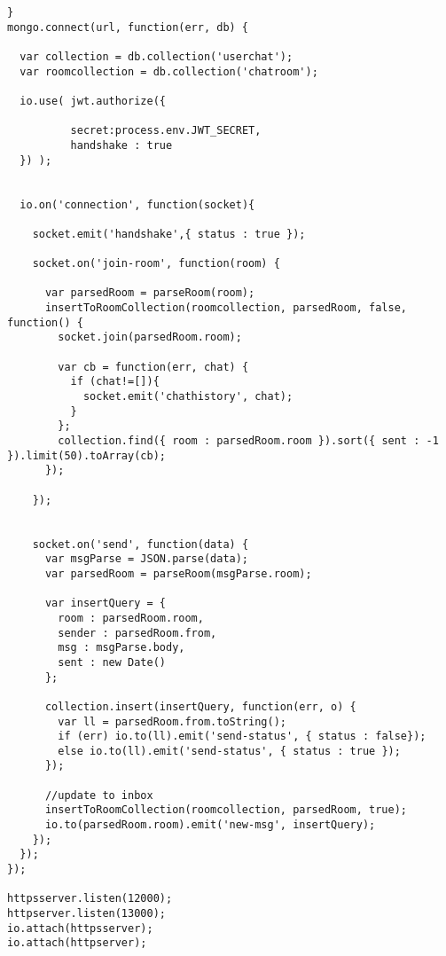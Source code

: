 \begin{lstlisting}[label=sc-socket-chat,style=htmlcssjs,caption=Kode Sumber Implementasi Node.js + Socket.io untuk \textit{Chat}]
}
mongo.connect(url, function(err, db) {

  var collection = db.collection('userchat');
  var roomcollection = db.collection('chatroom');

  io.use( jwt.authorize({

          secret:process.env.JWT_SECRET,
          handshake : true
  }) );


  io.on('connection', function(socket){

    socket.emit('handshake',{ status : true });

    socket.on('join-room', function(room) {

      var parsedRoom = parseRoom(room);
      insertToRoomCollection(roomcollection, parsedRoom, false, function() {
        socket.join(parsedRoom.room);

        var cb = function(err, chat) {
          if (chat!=[]){
            socket.emit('chathistory', chat);
          }
        };
        collection.find({ room : parsedRoom.room }).sort({ sent : -1 }).limit(50).toArray(cb);
      });

    });


    socket.on('send', function(data) {
      var msgParse = JSON.parse(data);
      var parsedRoom = parseRoom(msgParse.room);

      var insertQuery = {
        room : parsedRoom.room,
        sender : parsedRoom.from,
        msg : msgParse.body,
        sent : new Date()
      };

      collection.insert(insertQuery, function(err, o) {
        var ll = parsedRoom.from.toString();
        if (err) io.to(ll).emit('send-status', { status : false});
        else io.to(ll).emit('send-status', { status : true });
      });

      //update to inbox
      insertToRoomCollection(roomcollection, parsedRoom, true);
      io.to(parsedRoom.room).emit('new-msg', insertQuery);
    });
  });
});

httpsserver.listen(12000);
httpserver.listen(13000);
io.attach(httpsserver);
io.attach(httpserver);
\end{lstlisting}